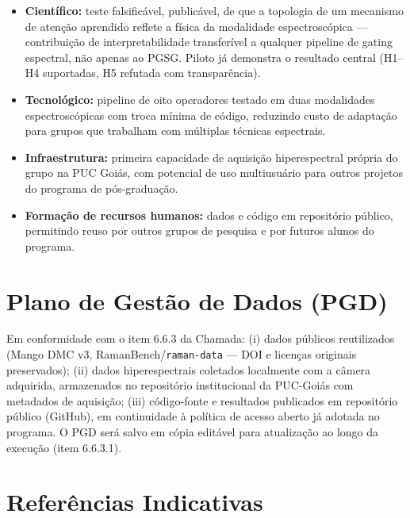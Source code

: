 \documentclass[11pt,a4paper]{article}
\begin{document}
\begin{itemize}
\item \textbf{Científico:} teste falsificável, publicável, de que a topologia de um mecanismo de atenção aprendido reflete a física da modalidade espectroscópica --- contribuição de interpretabilidade transferível a qualquer pipeline de gating espectral, não apenas ao PGSG. Piloto já demonstra o resultado central (H1--H4 suportadas, H5 refutada com transparência).
\item \textbf{Tecnológico:} pipeline de oito operadores testado em duas modalidades espectroscópicas com troca mínima de código, reduzindo custo de adaptação para grupos que trabalham com múltiplas técnicas espectrais.
\item \textbf{Infraestrutura:} primeira capacidade de aquisição hiperespectral própria do grupo na PUC Goiás, com potencial de uso multiusuário para outros projetos do programa de pós-graduação.
\item \textbf{Formação de recursos humanos:} dados e código em repositório público, permitindo reuso por outros grupos de pesquisa e por futuros alunos do programa.
\end{itemize}

\section{Plano de Gestão de Dados (PGD)}

Em conformidade com o item 6.6.3 da Chamada: (i) dados públicos reutilizados (Mango DMC v3, RamanBench/\texttt{raman-data} --- DOI e licenças originais preservados); (ii) dados hiperespectrais coletados localmente com a câmera adquirida, armazenados no repositório institucional da PUC-Goiás com metadados de aquisição; (iii) código-fonte e resultados publicados em repositório público (GitHub), em continuidade à política de acesso aberto já adotada no programa. O PGD será salvo em cópia editável para atualização ao longo da execução (item 6.6.3.1).

\section{Referências Indicativas}
\end{document}
